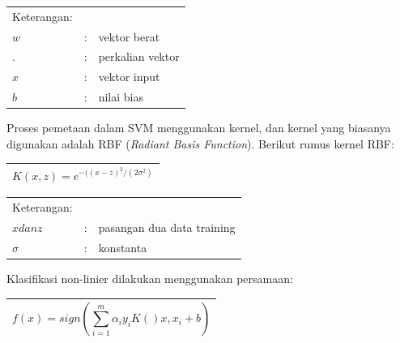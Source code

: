 \noindent
\renewcommand{\arraystretch}{1}
\begin{tabularx}{\textwidth}{lll}
\hline
Keterangan: \\
$w$ & : & vektor berat\\
$.$ & : & perkalian vektor\\
$x$ & : & vektor input\\
$b$ & : & nilai bias\\
\hline
\end{tabularx}
\vspace{4.5pt}

Proses pemetaan dalam SVM menggunakan kernel, dan kernel yang biasanya digunakan adalah RBF (\textit{Radiant Basis Function}). Berikut rumus kernel RBF:
\begin{table}[H]
	\small
	\begin{adjustbox}{width=1\textwidth}
		\begin{tabular}{|p{13.55cm}|}
			\hline
			\begin{equation} 
			\label{eqn:jarakfitur}
			K(x,z) = e^{-((x-z)^2/(2\sigma^2)}
			\end{equation}\\
			\hline
		\end{tabular}
	\end{adjustbox}
\end{table}

\noindent
\renewcommand{\arraystretch}{1}
\begin{tabularx}{\textwidth}{lll}
	\hline
	Keterangan: \\
	$x  dan  z$ & : & pasangan dua data training\\
	$\sigma$ & : & konstanta\\
	\hline
\end{tabularx}
\vspace{4.5pt}

Klasifikasi non-linier dilakukan menggunakan persamaan:
\begin{table}[H]
	\small
	\begin{adjustbox}{width=1\textwidth}
		\begin{tabular}{|p{13.55cm}|}
			\hline
			\begin{equation}
			\label{eqn:rbfkernel} 
			f(x) = sign(\sum\limits_{i=1}^{m}\alpha_{i}y_{i}K()x,x_{i}+b)
			\end{equation}\\
			\hline
		\end{tabular}
	\end{adjustbox}
\end{table}

